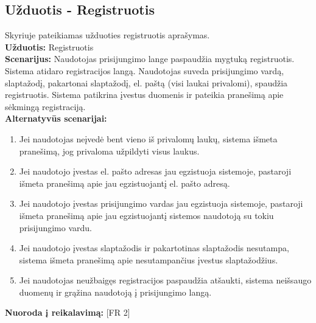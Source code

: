 \documentclass{VUMIFPSkursinis}
\begin{document}
	\subsection{Užduotis - Registruotis}
	Skyriuje pateikiamas užduoties registruotis aprašymas.\\
	\textbf{Užduotis:}  Registruotis \\
	\textbf{Scenarijus:} Naudotojas prisijungimo lange paspaudžia mygtuką registruotis. Sistema atidaro registracijos langą. Naudotojas suveda prisijungimo vardą, slaptažodį, pakartonai slaptažodį, el. paštą (visi laukai privalomi), spaudžia registruotis. Sistema patikrina įvestus duomenis ir pateikia pranešimą apie sėkmingą registraciją.\\
	\textbf{Alternatyvūs scenarijai:}\\
	\begin{enumerate}
		\item Jei naudotojas neįvedė bent vieno iš privalomų laukų, sistema išmeta pranešimą, jog privaloma užpildyti visus laukus.
		\item Jei naudotojo įvestas el. pašto adresas jau egzistuoja sistemoje, pastaroji išmeta pranešimą apie jau egzistuojantį el. pašto adresą.
		\item Jei naudotojo įvestas prisijungimo vardas jau egzistuoja sistemoje, pastaroji išmeta pranešimą apie jau egzistuojantį sistemos naudotoją su tokiu prisijungimo vardu. 
		\item Jei naudotojo įvestas slaptažodis ir pakartotinas slaptažodis nesutampa, sistema išmeta pranešimą apie nesutampančius įvestus slaptažodžius. 
		\item Jei naudotojas neužbaigęs registracijos paspaudžia atšaukti, sistema neišsaugo duomenų ir grąžina naudotoją į prisijungimo langą. 
	\end{enumerate}
	\textbf{Nuoroda į reikalavimą: } [FR 2]\\
	
\end{document}

